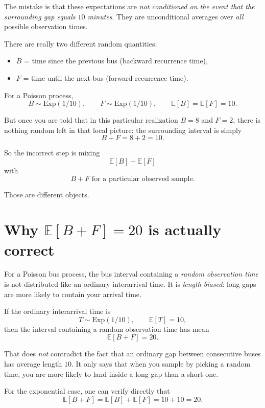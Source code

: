 \begin{eg}
The mistake is that these expectations are \emph{not conditioned on the event that the surrounding gap equals $10$ minutes}. They are unconditional averages over \emph{all} possible observation times.

There are really two different random quantities:

\begin{itemize}[leftmargin=2em]
    \item $B$ = time since the previous bus (backward recurrence time),
    \item $F$ = time until the next bus (forward recurrence time).
\end{itemize}

For a Poisson process,
\[
B \sim \mathrm{Exp}(1/10),
\qquad
F \sim \mathrm{Exp}(1/10),
\qquad
\mathbb{E}[B] = \mathbb{E}[F] = 10.
\]

But once you are told that in this particular realization $B=8$ and $F=2$, there is nothing random left in that local picture: the surrounding interval is simply
\[
B+F=8+2=10.
\]

So the incorrect step is mixing
\[
\mathbb{E}[B] + \mathbb{E}[F]
\]
with
\[
B+F \text{ for a particular observed sample.}
\]

Those are different objects.

\section*{Why $\mathbb{E}[B+F]=20$ is actually correct}

For a Poisson bus process, the bus interval containing a \emph{random observation time} is not distributed like an ordinary interarrival time. It is \emph{length-biased}: long gaps are more likely to contain your arrival time.

If the ordinary interarrival time is
\[
T \sim \mathrm{Exp}(1/10),
\qquad
\mathbb{E}[T]=10,
\]
then the interval containing a random observation time has mean
\[
\mathbb{E}[B+F] = 20.
\]

That does \emph{not} contradict the fact that an ordinary gap between consecutive buses has average length $10$. It only says that when you sample by picking a random time, you are more likely to land inside a long gap than a short one.

For the exponential case, one can verify directly that
\[
\mathbb{E}[B+F]=\mathbb{E}[B]+\mathbb{E}[F]=10+10=20.
\]

\begin{center}
\end{center}
\end{eg}
